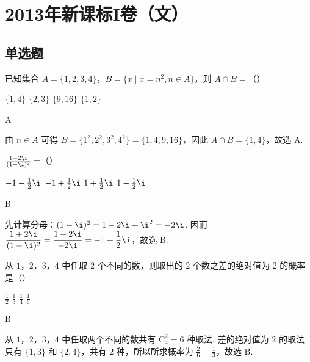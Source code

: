\chapter{2013年新课标I卷（文）}

\section{单选题}

\begin{problem}
已知集合 \(A = \{1, 2, 3, 4\}\)，\(B = \{x \mid x = n^2, n \in A\}\)，则 \(A \cap B =\)（\quad）

\choices
    {\(\{1, 4\}\)}
    {\(\{2, 3\}\)}
    {\(\{9, 16\}\)}
    {\(\{1, 2\}\)}
\end{problem}

\begin{answer}
A
\end{answer}

\begin{solution}
由 \(n \in A\) 可得 \(B=\{1^2,2^2,3^2,4^2\}=\{1,4,9,16\}\)，因此 \(A \cap B=\{1,4\}\)，故选 A.
\end{solution}

\begin{problem}
\(\frac{1 + 2\i}{(1 - \i)^2} =\)（\quad）

\choices
    {\(-1 - \frac{1}{2}\i\)}
    {\(-1 + \frac{1}{2}\i\)}
    {\(1 + \frac{1}{2}\i\)}
    {\(1 - \frac{1}{2}\i\)}
\end{problem}

\begin{answer}
B
\end{answer}

\begin{solution}
先计算分母：\((1-\i)^2=1-2\i+\i^2=-2\i\). 因而
\(\displaystyle\frac{1+2\i}{(1-\i)^2}=\frac{1+2\i}{-2\i}=-1+\frac{1}{2}\i\)，故选 B.
\end{solution}

\begin{problem}
从 \(1\)，\(2\)，\(3\)，\(4\) 中任取 \(2\) 个不同的数，则取出的 \(2\) 个数之差的绝对值为 \(2\) 的概率是（\quad）

\choices
    {\(\frac{1}{2}\)}
    {\(\frac{1}{3}\)}
    {\( \frac{1}{4} \)}
    {\(\frac{1}{6}\)}
\end{problem}

\begin{answer}
B
\end{answer}

\begin{solution}
从 \(1\)，\(2\)，\(3\)，\(4\) 中任取两个不同的数共有 \(\mathrm C_4^2=6\) 种取法. 差的绝对值为 \(2\) 的取法只有 \(\{1,3\}\) 和 \(\{2,4\}\)，共有 \(2\) 种，所以所求概率为 \(\displaystyle\frac{2}{6}=\frac{1}{3}\)，故选 B.
\end{solution}

